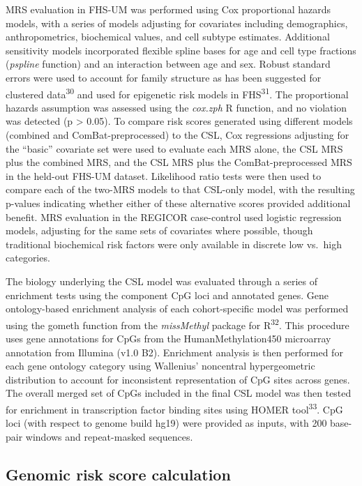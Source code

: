\documentclass[]{article}
\begin{document}
MRS evaluation in FHS-UM was performed using Cox proportional hazards
models, with a series of models adjusting for covariates including
demographics, anthropometrics, biochemical values, and cell subtype
estimates. Additional sensitivity models incorporated flexible spline
bases for age and cell type fractions (\emph{pspline} function) and an
interaction between age and sex. Robust standard errors were used to
account for family structure as has been suggested for clustered
data\textsuperscript{30} and used for epigenetic risk models in
FHS\textsuperscript{31}. The proportional hazards assumption was
assessed using the \emph{cox.zph} R function, and no violation was
detected (p \textgreater{} 0.05). To compare risk scores generated using
different models (combined and ComBat-preprocessed) to the CSL, Cox
regressions adjusting for the ``basic'' covariate set were used to
evaluate each MRS alone, the CSL MRS plus the combined MRS, and the CSL
MRS plus the ComBat-preprocessed MRS in the held-out FHS-UM dataset.
Likelihood ratio tests were then used to compare each of the two-MRS
models to that CSL-only model, with the resulting p-values indicating
whether either of these alternative scores provided additional benefit.
MRS evaluation in the REGICOR case-control used logistic regression
models, adjusting for the same sets of covariates where possible, though
traditional biochemical risk factors were only available in discrete low
vs.~high categories.

The biology underlying the CSL model was evaluated through a series of
enrichment tests using the component CpG loci and annotated genes. Gene
ontology-based enrichment analysis of each cohort-specific model was
performed using the gometh function from the \emph{missMethyl} package
for R\textsuperscript{32}. This procedure uses gene annotations for CpGs
from the HumanMethylation450 microarray annotation from Illumina (v1.0
B2). Enrichment analysis is then performed for each gene ontology
category using Wallenius' noncentral hypergeometric distribution to
account for inconsistent representation of CpG sites across genes. The
overall merged set of CpGs included in the final CSL model was then
tested for enrichment in transcription factor binding sites using HOMER
tool\textsuperscript{33}. CpG loci (with respect to genome build hg19)
were provided as inputs, with 200 base-pair windows and repeat-masked
sequences.

\hypertarget{genomic-risk-score-calculation}{%
\subsection{Genomic risk score
calculation}\label{genomic-risk-score-calculation}}
\end{document}
